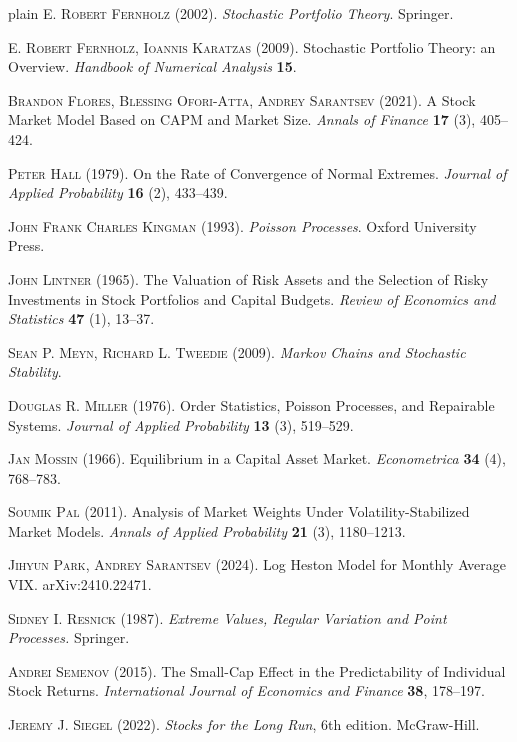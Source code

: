 \documentclass[12pt]{amsart}
\begin{document}
\begin{thebibliography}{plain}
 \textsc{E. Robert Fernholz} (2002). \textit{Stochastic Portfolio Theory}. Springer. 

 \textsc{E. Robert Fernholz, Ioannis Karatzas} (2009). Stochastic Portfolio Theory: an Overview. {\it Handbook of Numerical Analysis} \textbf{15}.

 \textsc{Brandon Flores, Blessing Ofori-Atta, Andrey Sarantsev} (2021). A Stock Market Model Based on CAPM and Market Size. \textit{Annals of Finance} \textbf{17} (3), 
405--424.

 \textsc{Peter Hall} (1979). On the Rate of Convergence of Normal Extremes. \textit{Journal of Applied Probability} \textbf{16} (2), 433--439.

 \textsc{John Frank Charles Kingman} (1993). \textit{Poisson Processes}. Oxford University Press. 

 \textsc{John Lintner} (1965). The Valuation of Risk Assets and the Selection of Risky Investments in Stock Portfolios and Capital Budgets. \textit{Review of Economics and Statistics} \textbf{47}  (1), 13--37.

 \textsc{Sean P. Meyn, Richard L. Tweedie} (2009). {\it Markov Chains and Stochastic Stability}. 

 \textsc{Douglas R. Miller} (1976). Order Statistics, Poisson Processes, and Repairable Systems.  \textit{Journal of Applied Probability} \textbf{13} (3), 519--529. 

 \textsc{Jan Mossin} (1966). Equilibrium in a Capital Asset Market. \textit{Econometrica} \textbf{34} (4), 768--783.

 \textsc{Soumik Pal} (2011). Analysis of Market Weights Under Volatility-Stabilized Market Models. \textit{Annals of Applied Probability} \textbf{21} (3), 1180--1213.

 \textsc{Jihyun Park, Andrey Sarantsev} (2024). Log Heston Model for Monthly Average VIX. arXiv:2410.22471.

 \textsc{Sidney I. Resnick} (1987). \textit{Extreme Values, Regular Variation and Point Processes.} Springer. 

 \textsc{Andrei Semenov} (2015). The Small-Cap Effect in the Predictability of Individual Stock Returns. \textit{International Journal of Economics and Finance} \textbf{38}, 178--197.

 \textsc{Jeremy J. Siegel} (2022). {\it Stocks for the Long Run}, 6th edition. McGraw-Hill.


\end{thebibliography}
\end{document}
